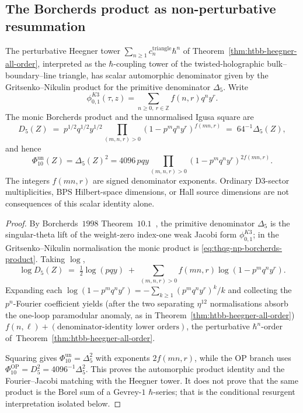 \subsection{The Borcherds product as non-perturbative resummation}
\label{subsec:thqg-np-borcherds-resummation}

\begin{theorem}
\label{thm:thqg-np-borcherds-resummation}
The perturbative Heegner tower $\sum_{n\geq 1}c_n^{\mathrm{triangle}}\hbar^n$
of Theorem~\ref{thm:htbb-heegner-all-order}, interpreted as the
$\hbar$-coupling tower of the twisted-holographic bulk--boundary--line
triangle, has scalar automorphic denominator given by the
Gritsenko--Nikulin product for the primitive denominator $\Delta_5$.
Write
\[
 \phi_{0,1}^{K3}(\tau,z)=\sum_{n\geq 0,\ r\in\mathbb Z} f(n,r)q^n y^r.
\]
The monic Borcherds product and the unnormalised Igusa square are
\begin{equation}\label{eq:thqg-np-borcherds-product}
 D_5(Z)
 \;=\;
 p^{1/2}q^{1/2}y^{1/2}
 \prod_{(m, n, r)>0}\!(1 - p^m q^n y^r)^{f(mn,r)}
 \;=\;64^{-1}\Delta_5(Z),
\end{equation}
and hence
\[
 \Phi_{10}^{\mathrm{un}}(Z)
 =\Delta_5(Z)^2
 =4096\,p q y
 \prod_{(m,n,r)>0}(1-p^m q^n y^r)^{2f(mn,r)}.
\]
The integers $f(mn,r)$ are signed denominator exponents.  Ordinary
D$3$-sector multiplicities, BPS Hilbert-space dimensions, or Hall
source dimensions are not consequences of this scalar identity alone.
\end{theorem}

\begin{proof}
By Borcherds~$1998$ Theorem~$10.1$~\cite[Thm.~10.1]{Borcherds1998},
the primitive denominator $\Delta_5$ is the singular-theta lift of the
weight-zero index-one weak Jacobi form $\phi_{0,1}^{K3}$; in the
Gritsenko--Nikulin normalisation the monic product is
\eqref{eq:thqg-np-borcherds-product}. Taking $\log$,
\[
 \log D_5(Z) \;=\; \tfrac12\log(pqy)
 \;+\; \sum_{(m, n, r)>0}f(mn,r)\log(1 - p^m q^n y^r).
\]
Expanding each $\log(1 - p^m q^n y^r) = -\sum_{k\geq 1}(p^m q^n y^r)^k/k$
and collecting the $p^n$-Fourier coefficient yields (after the two
separating \(\eta^{12}\) normalisations absorb the one-loop paramodular anomaly,
as in Theorem~\ref{thm:htbb-heegner-all-order})
$f(n,\ell) + (\text{denominator-identity lower orders})$, the
perturbative $\hbar^n$-order
of~Theorem~\ref{thm:htbb-heegner-all-order}.

Squaring gives $\Phi_{10}^{\mathrm{un}}=\Delta_5^2$ with exponents
$2f(mn,r)$, while the OP branch uses
$\Phi_{10}^{\mathrm{OP}}=D_5^2=4096^{-1}\Delta_5^2$.  This proves the
automorphic product identity and the Fourier--Jacobi matching with the
Heegner tower. It does not prove that the same product is the Borel sum
of a Gevrey-$1$ $\hbar$-series; that is the conditional resurgent
interpretation isolated below.
\end{proof}

